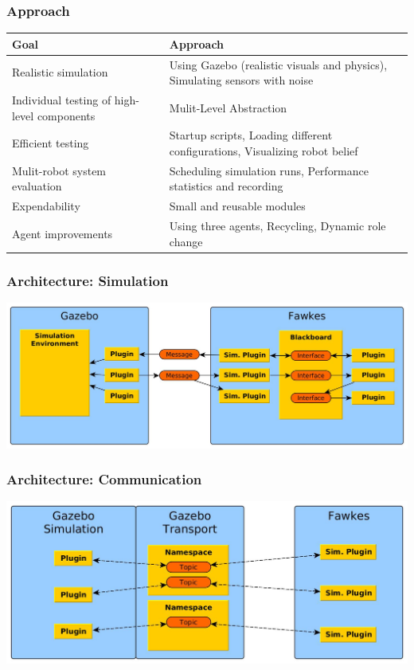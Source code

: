\documentclass[]{beamer}
\begin{document}
\begin{frame}
  \frametitle{Approach}
  \begin{tabular}{p{3.7cm}|p{7.5cm}}
    \hline
    \large{\textbf{Goal}} & \large{\textbf{Approach}}\\
    \hline
    Realistic simulation & Using Gazebo (realistic visuals and physics), \newline Simulating sensors with noise \pause \\ 
    \hline
    Individual testing of high-level components & Mulit-Level Abstraction \pause \\
    \hline
    Efficient testing & Startup scripts, \newline Loading different configurations, \newline Visualizing robot belief \pause\\ 
    \hline
    Mulit-robot system evaluation & Scheduling simulation runs, \newline Performance statistics and recording \pause\\    
    \hline
    Expendability & Small and reusable modules \pause\\
    \hline
    Agent improvements & Using three agents, \newline Recycling, \newline Dynamic role change\\
    \hline    
  \end{tabular}
\end{frame}

\begin{frame}
  \frametitle{Architecture: Simulation}
  \includegraphics[width=\textwidth]{../tabs/fawkes_gazebo.jpg}
\end{frame}

\begin{frame}
  \frametitle{Architecture: Communication}
  \includegraphics[width=\textwidth]{../tabs/communication.jpg}
\end{frame}
\end{document}

